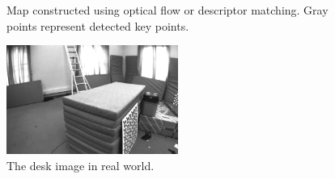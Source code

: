 \documentclass[11pt]{easychair}
\begin{document}
\begin{figure}[h!]
\centering
{}
\caption{Map constructed using optical flow or descriptor matching. Gray points represent detected key points.}
\end{figure}

\begin{figure}
	\centering
	\includegraphics[width=0.5\textwidth]{img/desk.png}
	\caption{The desk image in real world.}
	\label{fig:desk}
\end{figure}
\end{document}
